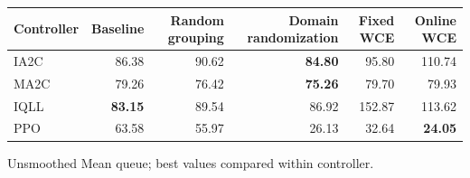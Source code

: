 \begin{tabular}{lrrrrr}
\hline
Controller & Baseline & Random grouping & Domain randomization & Fixed WCE & Online WCE \\
\hline
IA2C & 86.38 & 90.62 & \textbf{84.80} & 95.80 & 110.74 \\
MA2C & 79.26 & 76.42 & \textbf{75.26} & 79.70 & 79.93 \\
IQLL & \textbf{83.15} & 89.54 & 86.92 & 152.87 & 113.62 \\
PPO & 63.58 & 55.97 & 26.13 & 32.64 & \textbf{24.05} \\
\hline
\end{tabular}
Unsmoothed Mean queue; best values compared within controller.
